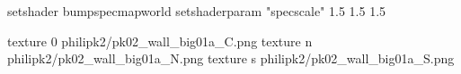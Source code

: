 setshader bumpspecmapworld
setshaderparam "specscale" 1.5 1.5 1.5

texture 0 philipk2/pk02_wall_big01a_C.png
texture n philipk2/pk02_wall_big01a_N.png
texture s philipk2/pk02_wall_big01a_S.png

